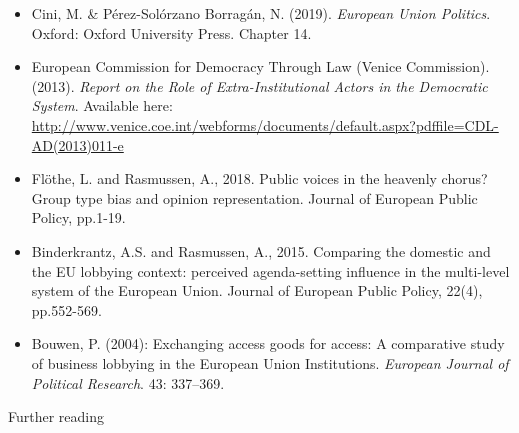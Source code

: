 \begin{itemize}
	\item Cini, M. \& P\'{e}rez-Sol\'{o}rzano Borrag\'{a}n, N. (2019). \textit{European Union Politics}. Oxford: Oxford University Press. Chapter 14.
	\item European Commission for Democracy Through Law (Venice Commission). (2013). \textit{Report on the Role of Extra-Institutional Actors in the Democratic System}. Available here: \url{http://www.venice.coe.int/webforms/documents/default.aspx?pdffile=CDL-AD(2013)011-e}
	\item Fl{\"o}the, L. and Rasmussen, A., 2018. Public voices in the heavenly chorus? Group type bias and opinion representation. Journal of European Public Policy, pp.1-19.
	\item Binderkrantz, A.S. and Rasmussen, A., 2015. Comparing the domestic and the EU lobbying context: perceived agenda-setting influence in the multi-level system of the European Union. Journal of European Public Policy, 22(4), pp.552-569.
	\item Bouwen, P. (2004): Exchanging access goods for access: A comparative study of business lobbying in the European Union Institutions. \textit{European Journal of Political Research}. 43: 337–369.

\end{itemize}

\noindent Further reading

